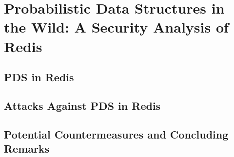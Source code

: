 \chapter{Probabilistic Data Structures in the Wild: A Security Analysis of Redis }



\section{PDS in Redis}


\section{Attacks Against PDS in Redis}


\section{Potential Countermeasures and Concluding Remarks}

